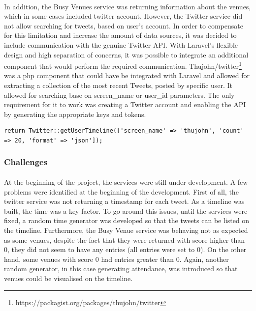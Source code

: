 \documentclass{l4proj}
\begin{document}
\paragraph{}
In addition, the Busy Venues service was returning information about the venues, which in some cases included twitter account. However, the Twitter service did not allow searching for tweets, based on user's account. In order to compensate for this limitation and increase the amount of data sources, it was decided to include communication with the genuine Twitter API. With Laravel's flexible design and high separation of concerns, it was possible to integrate an additional component that would perform the required communication. Thujohn/twitter\footnote{https://packagist.org/packages/thujohn/twitter} was a php component that could have be integrated with Laravel and allowed for extracting a collection of the most recent Tweets, posted by specific user. It allowed for searching base on screen\_name or user\_id parameters. The only requirement for it to work was creating a Twitter account and enabling the API by generating the appropriate keys and tokens. 
\begin{lstlisting}
return Twitter::getUserTimeline(['screen_name' => 'thujohn', 'count' => 20, 'format' => 'json']);
\end{lstlisting}

\subsubsection{Challenges}
\paragraph{}
At the beginning of the project, the services were still under development. A few problems were identified at the beginning of the development. First of all, the twitter service was not returning a timestamp for each tweet. As a timeline was built, the time was a key factor. To go around this issues, until the services were fixed, a random time generator was developed so that the tweets can be listed on the timeline. Furthermore, the Busy Venue service was behaving not as expected as some venues, despite the fact that they were returned with score higher than 0, they did not seem to have any entries (all entries were set to 0). On the other hand, some venues with score 0 had entries greater than 0. Again, another random generator, in this case generating attendance, was introduced so that venues could be visualised on the timeline. 
\end{document}
